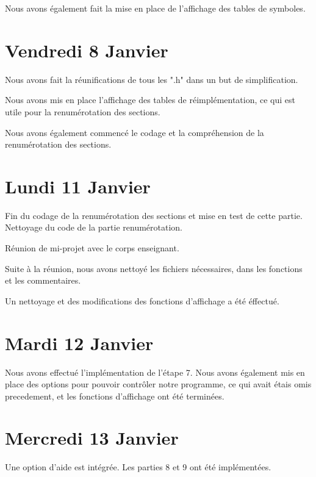 \documentclass[12pt, a4paper]{article}
\begin{document}
Nous avons également fait la mise en place de l’affichage des tables de symboles.

\section{Vendredi 8 Janvier}

Nous avons fait la réunifications de tous les ".h" dans un but de 
simplification.

Nous avons mis en place l’affichage des tables de r\'eimplémentation, ce qui 
est utile pour la renumérotation des sections.

Nous avons également commencé le codage et la compréhension de la 
renumérotation des sections. 

\section{Lundi 11 Janvier}

Fin du codage de la renumérotation des sections et mise en test de cette partie.
Nettoyage du code de la partie renumérotation.

Réunion de mi-projet avec le corps enseignant.

Suite à la réunion, nous avons nettoyé les fichiers nécessaires, dans les 
fonctions et les commentaires. 

Un nettoyage et des modifications des fonctions d'affichage a été éffectué.


\section{Mardi 12 Janvier}

Nous avons effectué l'implémentation de l'étape 7.
Nous avons également mis en place des options pour pouvoir contrôler notre programme, ce qui avait 
étais omis precedement, et les fonctions d'affichage ont été terminées.

\section{Mercredi 13 Janvier}

Une option d'aide est intégrée.
Les parties 8 et 9 ont été implémentées.
\end{document}
